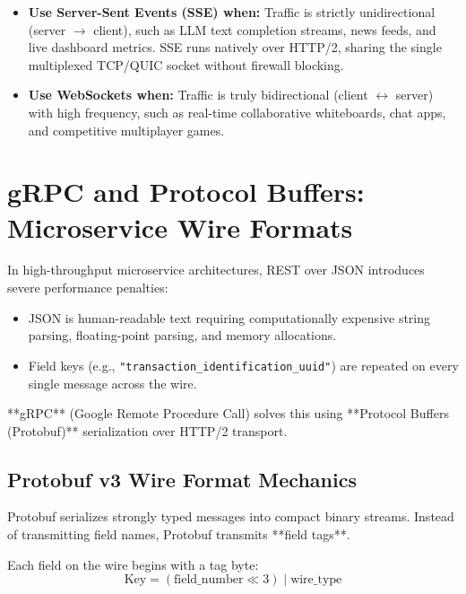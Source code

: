 \begin{intuitionbox}
\begin{itemize}[leftmargin=15pt]
  \item \textbf{Use Server-Sent Events (SSE) when:} Traffic is strictly unidirectional (server $\rightarrow$ client), such as LLM text completion streams, news feeds, and live dashboard metrics. SSE runs natively over HTTP/2, sharing the single multiplexed TCP/QUIC socket without firewall blocking.
  \item \textbf{Use WebSockets when:} Traffic is truly bidirectional (client $\leftrightarrow$ server) with high frequency, such as real-time collaborative whiteboards, chat apps, and competitive multiplayer games.
\end{itemize}
\end{intuitionbox}

\section{gRPC and Protocol Buffers: Microservice Wire Formats}

In high-throughput microservice architectures, REST over JSON introduces severe performance penalties:
\begin{itemize}[leftmargin=15pt]
  \item JSON is human-readable text requiring computationally expensive string parsing, floating-point parsing, and memory allocations.
  \item Field keys (e.g., \texttt{"transaction\_identification\_uuid"}) are repeated on every single message across the wire.
\end{itemize}
**gRPC** (Google Remote Procedure Call) solves this using **Protocol Buffers (Protobuf)** serialization over HTTP/2 transport.

\subsection{Protobuf v3 Wire Format Mechanics}

Protobuf serializes strongly typed messages into compact binary streams. Instead of transmitting field names, Protobuf transmits **field tags**.

Each field on the wire begins with a tag byte:
$$\text{Key} = (\text{field\_number} \ll 3) \mid \text{wire\_type}$$

